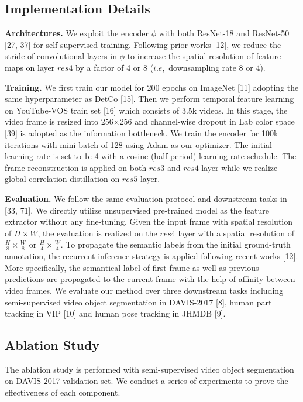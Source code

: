 \documentclass{article}
\begin{document}
\subsection{Implementation Details}
\textbf{Architectures.} We exploit the encoder $\phi$ with both ResNet-18 and ResNet-50 [27, 37] for self-supervised training. Following prior works [12], we reduce the stride of convolutional layers in $\phi$ to increase the spatial resolution of feature maps on layer $res4$  by a factor of 4 or 8 ($i.e,$ downsampling rate 8 or 4). 

\textbf{Training.}
We first train our model for 200 epochs on ImageNet [11] adopting the same hyperparameter as DetCo [15]. Then we perform temporal feature learning on YouTube-VOS train set [16] which consists of 3.5k videos. In this stage, the video frame is resized into 256$\times$256 and channel-wise dropout in Lab color space [39] is adopted as the information bottleneck. We train the encoder for 100k iterations with mini-batch of 128  using Adam as our optimizer. The initial learning rate is set to 1e-4 with a cosine (half-period) learning rate schedule. The frame reconstruction is applied on both $res3$ and $res4$ layer while we realize global correlation distillation on $res5$ layer.

\textbf{Evaluation.}
We follow the same evaluation protocol and downstream tasks in [33, 71]. We directly utilize unsupervised pre-trained model as the feature extractor without any fine-tuning.  Given the input frame with  spatial resolution of $H\times W$, the evaluation is realized on the $res4$ layer with a spatial resolution of $\frac{H}{8} \times \frac{W}{8}$ or $\frac{H}{4} \times \frac{W}{4}$. To propagate the semantic labels from the initial ground-truth annotation, the recurrent inference strategy is applied following recent works [12]. More specifically,  the semantical label of first frame as well as previous predictions are propagated to the current frame with the help of affinity between video frames. We evaluate our method over three downstream tasks including semi-supervised video object segmentation in DAVIS-2017 [8], human part tracking in VIP [10] and human pose tracking in JHMDB [9].

\subsection{Ablation Study}
The ablation study is performed with semi-supervised video object segmentation on DAVIS-2017 validation set. We conduct a series of experiments to prove the effectiveness of each  component. 
\end{document}
